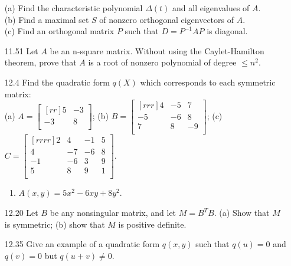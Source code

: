 \documentclass[12pt]{article}
\theoremstyle{plain}
\theoremstyle{definition}
\theoremstyle{plain}
\begin{document}
\begin{enumerate}
(a) Find the characteristic polynomial $\Delta(t)$ and all eigenvalues of $A$.\\
(b) Find a maximal set $S$ of nonzero orthogonal eigenvectors of $A$.\\
(c) Find an orthogonal matrix $P$ such that $D=P^{-1}AP$ is diagonal.
\item[11.51]Let $A$ be an n-square matrix. Without using the Caylet-Hamilton theorem, prove that $A$ is a root of nonzero polynomial of degree $\leq n^2$.
\item[12.4]Find the quadratic form $q(X)$ which corresponds to each symmetric matrix:\\
(a) $A=\begin{bmatrix}[rr]5&-3\\-3&8\\\end{bmatrix}$; (b) $B=\begin{bmatrix}[rrr]4&-5&7\\-5&-6&8\\7&8&-9\\\end{bmatrix}$; (c) $C=\begin{bmatrix}[rrrr]2&4&-1&5\\4&-7&-6&8\\-1&-6&3&9\\5&8&9&1\\\end{bmatrix}$.
	\begin{enumerate}
	\item $A(x,y) = 5x^2-6xy+8y^2$.
	\end{enumerate}
\item[12.20]Let $B$ be any nonsingular matrix, and let $M=B^TB$. (a) Show that $M$ is symmetric; (b) show that $M$ is positive definite.
\item[12.35]Give an example of a quadratic form $q(x,y)$ such that $q(u)=0$ and $q(v)=0$ but $q(u+v)\neq 0$.



\end{enumerate}
\end{document}
